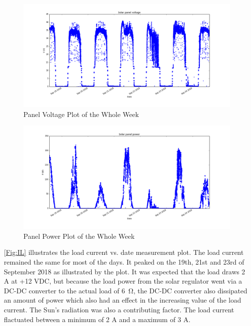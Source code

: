 \documentclass[12pt,a4paper]{report}
\begin{document}
\begin{figure}[h!]
	\begin{center}
		\includegraphics[width=1\linewidth]{Figures/VPV.png}
		\caption{Panel Voltage Plot of the Whole Week}
		\label{Fig:VPV}
	\end{center}
\end{figure}

\begin{figure}[h!]
	\begin{center}
		\includegraphics[width=1\linewidth]{Figures/PPV.png}
		\caption{Panel Power Plot of the Whole Week}
		\label{Fig:PPV}
	\end{center}
\end{figure}


\autoref{Fig:IL} illustrates the load current vs. date measurement plot. The load current remained the same for most of the days. It peaked on the 19th, 21st and 23rd of September 2018 as illustrated by the plot. It was expected that the load draws 2 A at +12 VDC, but because the load power from the solar regulator went via a DC-DC converter to the actual load of \SI{6}{\ohm}, the DC-DC converter also dissipated an amount of power which also had an effect in the increasing value of the load current. The Sun's radiation was also a contributing factor. The load current flactuated between a minimum of 2 A and a maximum of 3 A.
\end{document}

